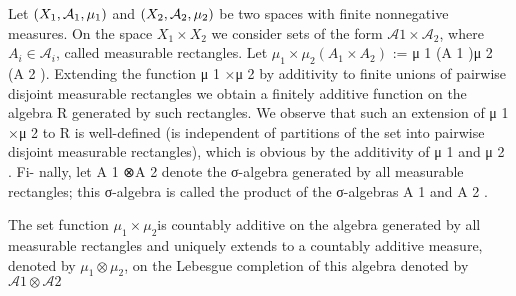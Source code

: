 Let $\left( X_1, \mathcal{A}_1, \mu_1 \right)$ and $\left( X_2, \mathcal{A}_2, \mu_2 \right)$ be two spaces with finite nonnegative measures. On the space $X_1\times X_2$ we consider sets of the form $\mathcal{A} 1\times\mathcal{A}_2$, where $A_i \in \mathcal{A}_i$, called measurable rectangles. Let $\mu_1\times \mu _2(A_1 \times A_2 )$  := μ 1 (A 1 )μ 2 (A 2 ).
Extending the function μ 1 ×μ 2 by additivity to finite unions of pairwise disjoint
measurable rectangles we obtain a finitely additive function on the algebra R
generated by such rectangles. We observe that such an extension of μ 1 ×μ 2 to
R is well-defined (is independent of partitions of the set into pairwise disjoint
measurable rectangles), which is obvious by the additivity of μ 1 and μ 2 . Fi-
nally, let A 1 ⊗A 2 denote the σ-algebra generated by all measurable rectangles;
this σ-algebra is called the product of the σ-algebras A 1 and A 2 .

\begin{theorem} The set function $\mu_1\times \mu_2$is countably additive on the algebra generated by all measurable rectangles and uniquely extends to a countably additive measure, denoted by $\mu_1\otimes\mu_2$, on the Lebesgue completion of this algebra denoted by $\mathcal{A} 1\otimes\mathcal{A} 2$
\end{theorem}